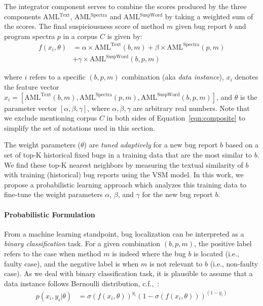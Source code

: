 The integrator component serves to combine the scores produced by the three components AML$^\text{Text}$, AML$^\text{Spectra}$ and AML$^\text{SuspWord}$ by taking a weighted sum of the scores. The final suspiciousness score of method $m$ given bug report $b$ and program spectra $p$ in a corpus $C$ is given by:
\begin{align}
\label{eqn:composite}
f(x_i, \theta) &= \alpha \times \text{AML}^\text{Text}(b,m) + \beta \times \text{AML}^\text{Spectra}(p,m) \nonumber\\
&+ \gamma \times \text{AML}^\text{SuspWord}(b,p,m)
\end{align}

\noindent where $i$ refers to a specific $(b,p,m)$ combination (aka \emph{data instance}), $x_i$ denotes the feature vector $x_i = [ \text{AML}^\text{Text}(b,m), \text{AML}^\text{Spectra}(p,m), \text{AML}^\text{SuspWord}(b,p,m)]$, and $\theta$ is the parameter vector $[ \alpha, \beta, \gamma ]$, where $\alpha, \beta, \gamma$ are arbitrary real numbers. Note that we exclude mentioning corpus $C$ in both sides of Equation~\ref{eqn:composite} to simplify the set of notations used in this section.

The weight parameters ($\theta$) are {\em tuned adaptively} for a new bug report $b$ based on a set of top-K historical fixed bugs in a training data that are the most similar to $b$. We find these top-K nearest neighbors by measuring the textual similarity of $b$ with training (historical) bug reports using the VSM model. In this work, we propose a probabilistic learning approach which analyzes this training data to fine-tune the weight parameters $\alpha$, $\beta$, and $\gamma$ for the new bug report $b$.

\paragraph{Probabilistic Formulation} \hspace{0pt} 
From a machine learning standpoint, bug localization can be interpreted as a \emph{binary classification} task. For a given combination $(b, p, m)$, the positive label refers to the case when method $m$ is indeed where the bug $b$ is located (i.e., faulty case), and the negative label is when $m$ is not relevant to $b$ (i.e., non-faulty case). As we deal with binary classification task, it is plausible to assume that a data instance follows Bernoulli distribution, c.f.,~\cite{Murphy12}:
\begin{align}
p(x_i, y_i| \theta) &= \sigma(f(x_i, \theta))^{y_i} \left( 1 - \sigma(f(x_i, \theta)) \right)^{(1 - y_i)}
\end{align}

